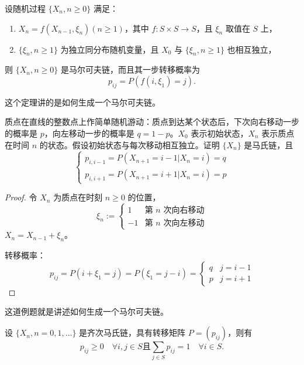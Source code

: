 \documentclass[lang=cn,10pt,thmcnt=section]{elegantbook}
\begin{document}
\begin{theorem}
	设随机过程 $\{X_n, n \geq 0\}$ 满足：
\begin{enumerate}
    \item $X_n = f(X_{n-1}, \xi_n) (n \geq 1)$，其中 $f: S \times S \rightarrow S$，且 $\xi_n$ 取值在 $S$ 上，
    \item $\{\xi_n, n \geq 1\}$ 为独立同分布随机变量，且 $X_0$ 与 $\{\xi_n, n \geq 1\}$ 也相互独立，
\end{enumerate}
则 $\{X_n, n \geq 0\}$ 是马尔可夫链，而且其一步转移概率为
\[
p_{ij} = P(f(i, \xi_1) = j).
\]
\end{theorem}
\begin{remark}
	这个定理讲的是如何生成一个马尔可夫链。
\end{remark}
\begin{example}
	质点在直线的整数点上作简单随机游动：质点到达某个状态后，下次向右移动一步的概率是 $p$，向左移动一步的概率是 $q = 1 - p$。$X_0$ 表示初始状态，$X_n$ 表示质点在时间 $n$ 的状态。假设初始状态与每次移动相互独立。证明 $\{X_n\}$ 是马氏链，且
\[
\begin{cases}
p_{i, i-1} = P(X_{n+1} = i - 1 | X_n = i) = q \\
p_{i, i+1} = P(X_{n+1} = i + 1 | X_n = i) = p
\end{cases}
\]

\end{example}
\begin{proof}
	令 $X_n$ 为质点在时刻 $n \geq 0$ 的位置，
\[
\xi_n := 
\begin{cases}
1 & \text{第 } n \text{ 次向右移动} \\
-1 & \text{第 } n \text{ 次向左移动}
\end{cases}
\]
$X_n = X_{n-1} + \xi_n$。

转移概率：
\[
p_{ij} = P(i + \xi_1 = j) = P(\xi_1 = j - i) = 
\begin{cases}
q & j = i - 1 \\
p & j = i + 1
\end{cases}
\]
\end{proof}
\begin{remark}
	这道例题就是讲述如何生成一个马尔可夫链。
\end{remark}

设 $\{X_n, n = 0, 1, \ldots\}$ 是齐次马氏链，具有转移矩阵 $P = (p_{ij})$，则有
\[ p_{ij} \geq 0 \quad \forall i, j \in S \text{且} \sum_{j \in S} p_{ij} = 1 \quad \forall i \in S. \]
\end{document}
